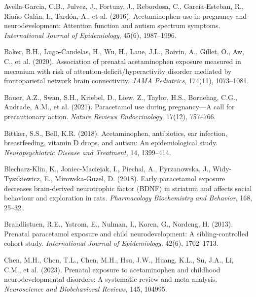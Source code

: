 \documentclass[12pt]{article}
\begin{document}


\begin{thebibliography}{99}

Avella-Garcia, C.B., Julvez, J., Fortuny, J., Rebordosa, C., García-Esteban, R., Riaño Galán, I., Tardón, A., et al. (2016).
Acetaminophen use in pregnancy and neurodevelopment: Attention function and autism spectrum symptoms.
\textit{International Journal of Epidemiology}, 45(6), 1987--1996.

Baker, B.H., Lugo-Candelas, H., Wu, H., Laue, J.L., Boivin, A., Gillet, O., Aw, C., et al. (2020).
Association of prenatal acetaminophen exposure measured in meconium with risk of attention-deficit/hyperactivity disorder mediated by frontoparietal network brain connectivity.
\textit{JAMA Pediatrics}, 174(11), 1073--1081.

Bauer, A.Z., Swan, S.H., Kriebel, D., Liew, Z., Taylor, H.S., Bornehag, C.G., Andrade, A.M., et al. (2021).
Paracetamol use during pregnancy---A call for precautionary action.
\textit{Nature Reviews Endocrinology}, 17(12), 757--766.

Bittker, S.S., Bell, K.R. (2018).
Acetaminophen, antibiotics, ear infection, breastfeeding, vitamin D drops, and autism: An epidemiological study.
\textit{Neuropsychiatric Disease and Treatment}, 14, 1399--414.

Blecharz-Klin, K., Joniec-Maciejak, I., Piechal, A., Pyrzanowska, J., Widy-Tyszkiewicz, E., Mirowska-Guzel, D. (2018).
Early paracetamol exposure decreases brain-derived neurotrophic factor (BDNF) in striatum and affects social behaviour and exploration in rats.
\textit{Pharmacology Biochemistry and Behavior}, 168, 25--32.

Brandlistuen, R.E., Ystrom, E., Nulman, I., Koren, G., Nordeng, H. (2013).
Prenatal paracetamol exposure and child neurodevelopment: A sibling-controlled cohort study.
\textit{International Journal of Epidemiology}, 42(6), 1702--1713.

Chen, M.H., Chen, T.L., Chen, M.H., Hsu, J.W., Huang, K.L., Su, J.A., Li, C.M., et al. (2023).
Prenatal exposure to acetaminophen and childhood neurodevelopmental disorders: A systematic review and meta-analysis.
\textit{Neuroscience and Biobehavioral Reviews}, 145, 104995.


\end{thebibliography}
\end{document}
